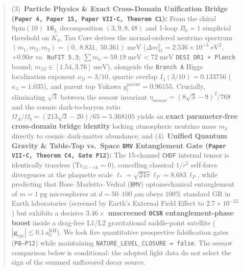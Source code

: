 \documentclass[11pt,a4paper]{article}
\begin{document}
\begin{abstract}
(3)~\textbf{Particle Physics \& Exact Cross-Domain Unification Bridge (\texttt{Paper 4, Paper 15, Paper VII-C, Theorem C1}):} From the chiral $\mathrm{Spin}(10)$ $\mathbf{16}_L$ decomposition $(3,9,8,48)$ and 1-loop $B_0=1$ simplicial threshold on $K_4$, Tau Core derives the normal-ordered neutrino spectrum $(m_1,m_2,m_3)=(0,\;8.831,\;50.361)\;\mathrm{meV}$ ($\Delta m_{31}^2=2.536\times 10^{-3}\;\mathrm{eV}^2$, $+0.90\sigma$ vs.\ \texttt{NuFIT 5.3}; $\sum m_\nu=59.19\;\mathrm{meV}<72\;\mathrm{meV}$ \texttt{DESI DR1 + Planck} bound; $m_{\beta\beta}\in[1.54,3.76]\;\mathrm{meV}$), alongside the \texttt{Branch A} Higgs localization exponent $\nu_D=3/10$, quartic overlap $I_4(3/10)=0.133756$ ($\kappa_\lambda=1.035$), and parent top Yukawa $y_t^{\mathrm{parent}}=0.96155$. Crucially, eliminating $\sqrt{3}$ between the seesaw invariant $\eta_{\mathrm{seesaw}}=(8\sqrt{3}-9)^2/768$ and the cosmic dark-to-baryon ratio $\Omega_A/\Omega_b=(213\sqrt{3}-20)/65=5.368105$ yields an \textbf{exact parameter-free cross-domain bridge identity} locking atmospheric neutrino mass $m_3$ directly to cosmic dark-matter abundance; and
(4)~\textbf{Unified Quantum Gravity \& Table-Top vs.\ Space \texttt{BMV} Entanglement Gate (\texttt{Paper VII-C, Theorem C4, Gate P12}):} The 15-channel \texttt{CHDF} internal tensor is identically traceless ($\mathrm{Tr}_{\mathrm{15-ch}}=0$), cancelling classical $1/r^2$ self-force divergences at the plaquette scale $\ell_*=\sqrt{24\pi}\ell_P=8.683\,\ell_P$, while predicting that Bose--Marletto--Vedral (\texttt{BMV}) optomechanical entanglement of $m=1\;\mathrm{pg}$ microspheres at $d=50\text{--}100\;\mu\mathrm{m}$ obeys $100\%$ standard GR in Earth laboratories (screened by Earth's External Field Effect to $2.7\times 10^{-22}$) but exhibits a decisive $\mathbf{3.46\times}$ \textbf{unscreened \texttt{OCSR} entanglement-phase boost} inside a drag-free L1/L2 gravitational saddle-point satellite ($|\mathbf{g}_{\mathrm{ext}}|\le 0.1\,a_0^{\mathrm{KH}}$). We lock five quantitative prospective falsification gates (\texttt{P8--P12}) while maintaining \texttt{NATURE\_LEVEL\_CLOSURE = false}.
The seesaw comparison below is conditional: the adopted light data do not select the sign of the summed unflavored decay source.
\end{abstract}
\end{document}

